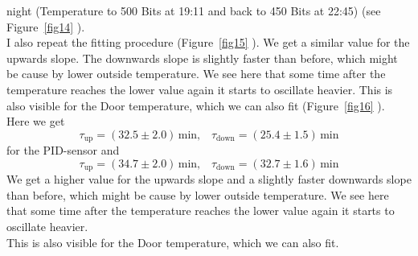 \documentclass[12pt]{scrartcl}
\begin{document}
      night (Temperature to 500 Bits at 19:11 and back to 450 Bits at 22:45)
      (see Figure~\ref{fig14} ). \\ I also repeat the fitting procedure
      (Figure~\ref{fig15} ). We get a similar value for the upwards slope. The
      downwards slope is slightly faster than before, which might be cause by
      lower outside temperature. We see here that some time after the
      temperature reaches the lower value again it starts to oscillate heavier.
      This is also visible for the Door temperature, which we can also fit
      (Figure~\ref{fig16} ). \\
      Here we get
      $$\tau_{\text{up}} = (32.5 \pm 2.0)\,\text{min}, \;\;\; \tau_{\text{down}} =
      (25.4 \pm 1.5) \,\text{min}$$
      for the PID-sensor and
      $$\tau_{\text{up}} = (34.7 \pm 2.0) \,\text{min}, \;\;\;
      \tau_{\text{down}} = (32.7 \pm 1.6) \,\text{min}$$
      We get a higher value for the upwards slope and a slightly faster
      downwards slope than before, which might be cause by lower outside
      temperature. We see here that some time after the temperature reaches the
      lower value again it starts to oscillate heavier.\\
      This is also visible for the Door temperature, which we can also fit.
\end{document}
